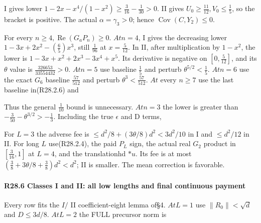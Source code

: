 I gives lower \(1-2x-x^4/(1-x^2)\ge \frac{3}{16}-\frac{1}{30}>0\). II gives \(U_0\ge \frac{11}{12},\allowbreak \allowbreak V_0\le \frac{1}{5}\), so the bracket is positive. The actual \(\alpha=\gamma_{3}>0\); hence \(\operatorname{Cov}(C,\allowbreak \allowbreak Y_{2})\le 0\).

For every \(n\ge 4,\allowbreak \allowbreak \operatorname{Re}(G_a P_n)\ge 0\). \(At n=4\), I gives the decreasing lower \(1-3x+2x^2-(\frac{6}{5})x^3\), still \(\frac{1}{96}\) at \(x=\frac{5}{12}\). In II, after multiplication by \(1-x^2\), the lower is \(1-3x+x^2+2x^3-3x^4+x^5\). Its derivative is negative on \([0,\allowbreak \allowbreak \frac{5}{12}]\), and its \(\theta\) value is \(\frac{326653}{33554432}>0\). \(At n=5\) use baseline \(\frac{1}{5}\) and perturb \(\theta^{5/2}<\frac{1}{5}\). \(At n=6\) use the exact \(G_{6}\) baseline \(\frac{57}{512}\) and perturb \(\theta^3<\frac{57}{512}\). \(At\) every \(n\ge 7\) use the last baseline in(R28.2.6) and


Thus the general \(\frac{1}{10}\) bound is unnecessary. \(At n=3\) the lower is greater than \(-\frac{3}{50}-\theta^{3/2}>-\frac{1}{3}\). Including the true \(\epsilon\) and D terms,


For \(L=3\) the adverse fee is \(\le d^2/8+(3\theta/8)d^2<3d^2/10\) in I and \(\le d^2/12\) in II. For long \(L\) use(R28.2.4), the paid \(P_L\) sign, the actual real \(G_{2}\) product in \([\frac{3}{16},\allowbreak \allowbreak 1]\) at \(L=4\), and the translationhd \(*u\). Its fee is at most \((\frac{3}{8}+3\theta/8+\frac{3}{8})d^2<d^2\); II is smaller. The mean correction is favorable.

\paragraph{R28.6 Classes I and II: all low lengths and final continuous payment}

Every row fits the \(I/\) II coefficient-eight lemma of§4. \(At L=1\) use \(\lVert R_0\rVert <\sqrt{d}\) and \(D\le 3d/8\). \(At L=2\) the FULL precursor norm is


